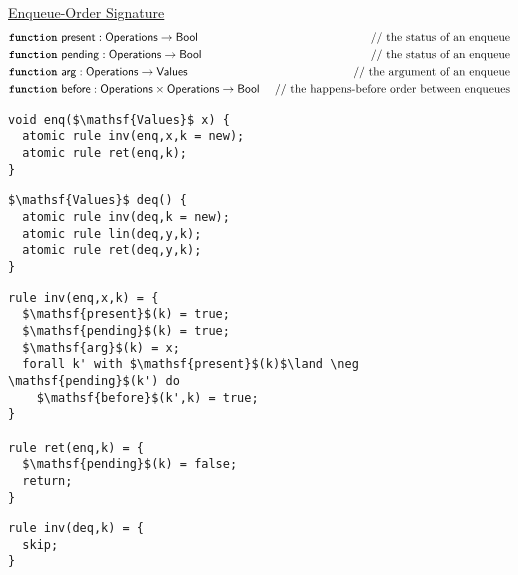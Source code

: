 \begin{figure}[t]
\scriptsize{
{	\centering
	\underline{Enqueue-Order Signature}
	\begin{align*}
		& \text{{\ttfamily \bfseries function}}\ \mathsf{present} : \mathsf{Operations} \rightarrow \mathsf{Bool} &\mbox{ // the status of an enqueue} \\
		& \text{{\ttfamily \bfseries function}}\ \mathsf{pending} : \mathsf{Operations} \rightarrow \mathsf{Bool} &\mbox{ // the status of an enqueue} \\
		& \text{{\ttfamily \bfseries function}}\ \mathsf{arg} : \mathsf{Operations} \rightarrow \mathsf{Values} &\mbox{ // the argument of an enqueue} \\
		& \text{{\ttfamily \bfseries function}}\ \mathsf{before} : \mathsf{Operations} \times \mathsf{Operations} \rightarrow \mathsf{Bool} &\mbox{ // the happens-before order between enqueues} \\
	\end{align*}
}}

\begin{minipage}[t]{7.5cm}
\begin{lstlisting}
void enq($\mathsf{Values}$ x) {
  atomic rule inv(enq,x,k = new);
  atomic rule ret(enq,k);
}
\end{lstlisting}
\end{minipage}
\begin{minipage}[t]{5cm}
\begin{lstlisting}
$\mathsf{Values}$ deq() {
  atomic rule inv(deq,k = new);
  atomic rule lin(deq,y,k);
  atomic rule ret(deq,y,k);
}
\end{lstlisting}
\end{minipage}

\begin{minipage}[t]{7.5cm}
\begin{lstlisting}
rule inv(enq,x,k) = {
  $\mathsf{present}$(k) = true;
  $\mathsf{pending}$(k) = true;
  $\mathsf{arg}$(k) = x;
  forall k' with $\mathsf{present}$(k)$\land \neg \mathsf{pending}$(k') do
    $\mathsf{before}$(k',k) = true;
}

rule ret(enq,k) = {
  $\mathsf{pending}$(k) = false;
  return;
}
\end{lstlisting}
\end{minipage}
\begin{minipage}[t]{5cm}
\begin{lstlisting}
rule inv(deq,k) = {
  skip;
}


\end{lstlisting}
\end{minipage}
\end{figure}
